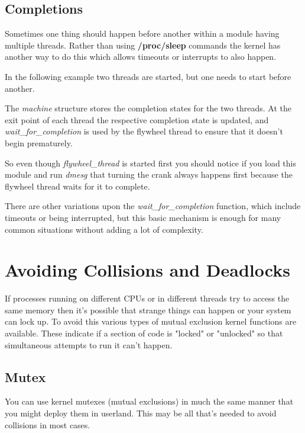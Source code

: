 \documentclass[10pt, oneside]{book}
\begin{document}


\subsection{Completions}
\label{sec:orgd9f9de4}
Sometimes one thing should happen before another within a module having multiple threads. Rather than using \textbf{/proc/sleep} commands the kernel has another way to do this which allows timeouts or interrupts to also happen.

In the following example two threads are started, but one needs to start before another.


The \emph{machine} structure stores the completion states for the two threads. At the exit point of each thread the respective completion state is updated, and \emph{wait\_for\_completion} is used by the flywheel thread to ensure that it doesn't begin prematurely.

So even though \emph{flywheel\_thread} is started first you should notice if you load this module and run \emph{dmesg} that turning the crank always happens first because the flywheel thread waits for it to complete.

There are other variations upon the \emph{wait\_for\_completion} function, which include timeouts or being interrupted, but this basic mechanism is enough for many common situations without adding a lot of complexity.

\section{Avoiding Collisions and Deadlocks}
\label{sec:org17fc2e9}
If processes running on different CPUs or in different threads try to access the same memory then it's possible that strange things can happen or your system can lock up. To avoid this various types of mutual exclusion kernel functions are available. These indicate if a section of code is "locked" or "unlocked" so that simultaneous attempts to run it can't happen.
\subsection{Mutex}
\label{sec:org04a65a4}
You can use kernel mutexes (mutual exclusions) in much the same manner that you might deploy them in userland. This may be all that's needed to avoid collisions in most cases.
\end{document}
